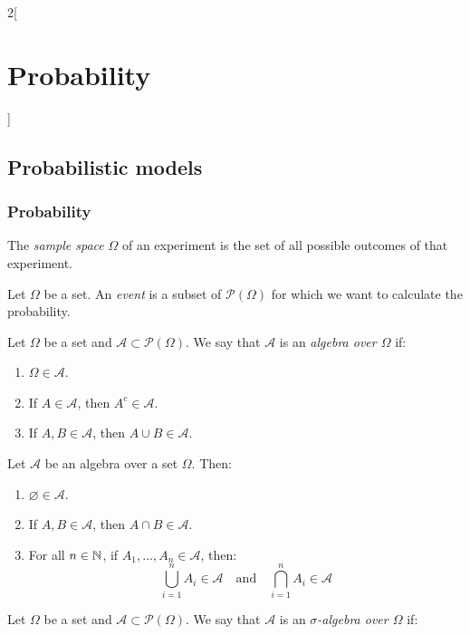 \documentclass[../../../main.tex]{subfiles}
\begin{document}
\begin{multicols}{2}[\section{Probability}]
  \subsection{Probabilistic models}
  \subsubsection{Probability}
  \begin{definition}
    The \textit{sample space} $\Omega$ of an experiment is the set of all possible outcomes of that experiment.
  \end{definition}
  \begin{definition}
    Let $\Omega$ be a set. An \textit{event} is a subset of $\mathcal{P}(\Omega)$ for which we want to calculate the probability.
  \end{definition}
  \begin{definition}
    Let $\Omega$ be a set and $\mathcal{A}\subset\mathcal{P}(\Omega)$. We say that $\mathcal{A}$ is an \textit{algebra over $\Omega$} if:
    \begin{enumerate}
      \item $\Omega\in\mathcal{A}$.
      \item If $A\in\mathcal{A}$, then $A^c\in\mathcal{A}$.
      \item If $A,B\in\mathcal{A}$, then $A\cup B\in\mathcal{A}$.
    \end{enumerate}
  \end{definition}
  \begin{prop}
    Let $\mathcal{A}$ be an algebra over a set $\Omega$. Then:
    \begin{enumerate}
      \item $\varnothing\in\mathcal{A}$.
      \item If $A,B\in\mathcal{A}$, then $A\cap B\in\mathcal{A}$.
      \item For all $n\in\mathbb{N}$, if $A_1,\ldots,A_n\in\mathcal{A}$, then: $$\bigcup_{i=1}^nA_i\in\mathcal{A}\quad\text{and}\quad\bigcap_{i=1}^nA_i\in\mathcal{A}$$
    \end{enumerate}
  \end{prop}
  \begin{definition}
    Let $\Omega$ be a set and $\mathcal{A}\subset\mathcal{P}(\Omega)$. We say that $\mathcal{A}$ is an \textit{$\sigma$-algebra over $\Omega$} if:

\end{definition}
\end{multicols}
\end{document}
